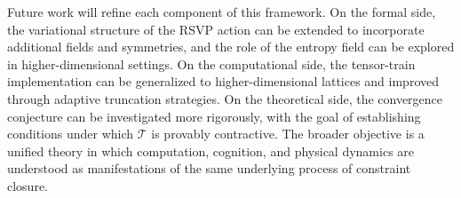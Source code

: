\documentclass[11pt]{article}
\theoremstyle{definition}
\begin{document}
Future work will refine each component of this framework. On the formal side,
the variational structure of the RSVP action can be extended to incorporate
additional fields and symmetries, and the role of the entropy field can be
explored in higher-dimensional settings. On the computational side, the
tensor-train implementation can be generalized to higher-dimensional lattices
and improved through adaptive truncation strategies. On the theoretical side,
the convergence conjecture can be investigated more rigorously, with the goal
of establishing conditions under which $\mathcal{T}$ is provably contractive.
The broader objective is a unified theory in which computation, cognition, and
physical dynamics are understood as manifestations of the same underlying
process of constraint closure.

\newpage
\end{document}
